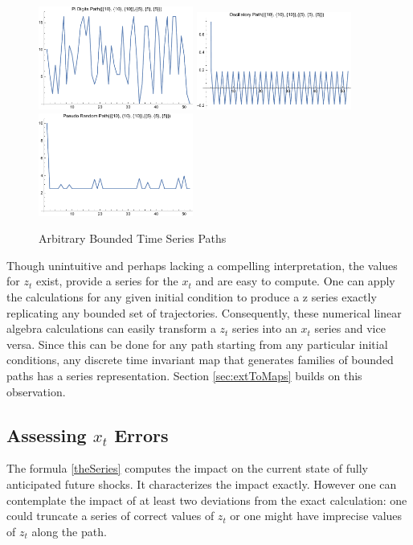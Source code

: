 \documentclass[12pt]{article}
\begin{document}
\begin{figure}
  \centering
\includegraphics[width=2in]{piPath.pdf}
\includegraphics[width=2in]{oscillPath.pdf}
\includegraphics[width=2in]{pseudoPath.pdf}
  
  \caption{Arbitrary Bounded Time Series Paths}\label{arbpaths}
\end{figure}





Though unintuitive and perhaps lacking a compelling 
interpretation, the values for
$z_t$ exist,  provide  a series for the $x_t$  and are easy to compute.
One can apply the calculations for any given initial condition to produce
a z series exactly replicating any bounded set of trajectories.  
Consequently, these
numerical linear algebra calculations can easily transform a $z_t$ series into an $x_t$ series and vice versa.  Since this can be done for any path starting from any particular initial conditions, 
any discrete time invariant map that generates families of bounded paths has a series representation. Section \ref{sec:extToMaps} builds on this observation.





\subsection{Assessing $x_t$ Errors}
\label{sec:truncationerr}
The formula \ref{theSeries} 
computes the impact on the current state of fully anticipated future shocks.  It characterizes the impact exactly.  However one can contemplate the impact of at least two deviations from the exact calculation:
one could truncate a series of correct values of $z_t$ or
one might have imprecise values of $z_t$ along the path.
\end{document}
